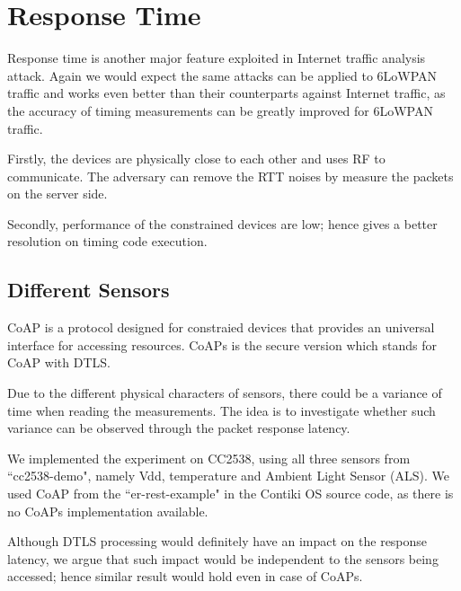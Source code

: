 \section{Response Time}
Response time is another major feature exploited in Internet traffic analysis attack. Again we would expect the same attacks can be applied to 6LoWPAN traffic and works even better than their counterparts against Internet traffic, as the accuracy of timing measurements can be greatly improved for 6LoWPAN traffic. 

Firstly, the devices are physically close to each other and uses RF to communicate. The adversary can remove the RTT noises by measure the packets on the server side. 

Secondly, performance of the constrained devices are low; hence gives a better resolution on timing code execution.

\subsection{Different Sensors}

CoAP\cite{rfc7252} is a protocol designed for constraied devices that provides an universal interface for accessing resources. CoAPs is the secure version which stands for CoAP with DTLS.

Due to the different physical characters of sensors, there could be a variance of time when reading the measurements. The idea is to investigate whether such variance can be observed through the packet response latency.

We implemented the experiment on CC2538, using all three sensors from ``cc2538-demo", namely Vdd, temperature and Ambient Light Sensor (ALS). We used CoAP from the ``er-rest-example" in the Contiki OS source code, as there is no CoAPs implementation available. 

Although DTLS processing would definitely have an impact on the response latency, we argue that such impact would be independent to the sensors being accessed; hence similar result would hold even in case of CoAPs.

